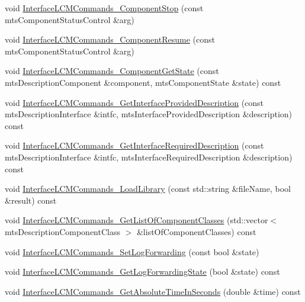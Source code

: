 \begin{DoxyCompactItemize}
\item 
void \hyperlink{classmts_manager_component_client_a96cc2f0e018d2ce86954aa69b1cd295a}{Interface\+L\+C\+M\+Commands\+\_\+\+Component\+Stop} (const mts\+Component\+Status\+Control \&arg)
\item 
void \hyperlink{classmts_manager_component_client_a824231e5ba9b118b7c5386ff43a21ceb}{Interface\+L\+C\+M\+Commands\+\_\+\+Component\+Resume} (const mts\+Component\+Status\+Control \&arg)
\item 
void \hyperlink{classmts_manager_component_client_a08e7f4f67ce5abb34704414d0a366630}{Interface\+L\+C\+M\+Commands\+\_\+\+Component\+Get\+State} (const mts\+Description\+Component \&component, mts\+Component\+State \&state) const 
\item 
void \hyperlink{classmts_manager_component_client_ae61750376c43687ea7699fd5c990b238}{Interface\+L\+C\+M\+Commands\+\_\+\+Get\+Interface\+Provided\+Description} (const mts\+Description\+Interface \&intfc, mts\+Interface\+Provided\+Description \&description) const 
\item 
void \hyperlink{classmts_manager_component_client_a1cccf382e2bfdd52e8f3d03cfeaf0c9d}{Interface\+L\+C\+M\+Commands\+\_\+\+Get\+Interface\+Required\+Description} (const mts\+Description\+Interface \&intfc, mts\+Interface\+Required\+Description \&description) const 
\item 
void \hyperlink{classmts_manager_component_client_ab928599ba071eafb6250534a641b5296}{Interface\+L\+C\+M\+Commands\+\_\+\+Load\+Library} (const std\+::string \&file\+Name, bool \&result) const 
\item 
void \hyperlink{classmts_manager_component_client_a8e82f0a9027807c37594cb4f5ce4f499}{Interface\+L\+C\+M\+Commands\+\_\+\+Get\+List\+Of\+Component\+Classes} (std\+::vector$<$ mts\+Description\+Component\+Class $>$ \&list\+Of\+Component\+Classes) const 
\item 
void \hyperlink{classmts_manager_component_client_a4e35db3722fc57873409058c123d7ec3}{Interface\+L\+C\+M\+Commands\+\_\+\+Set\+Log\+Forwarding} (const bool \&state)
\item 
void \hyperlink{classmts_manager_component_client_a943187af07d69373d01e77dcc1c460bf}{Interface\+L\+C\+M\+Commands\+\_\+\+Get\+Log\+Forwarding\+State} (bool \&state) const 
\item 
void \hyperlink{classmts_manager_component_client_aa613964d738cdf8ddd95b2804cd7e1e2}{Interface\+L\+C\+M\+Commands\+\_\+\+Get\+Absolute\+Time\+In\+Seconds} (double \&time) const 
\item 

\end{DoxyCompactItemize}
